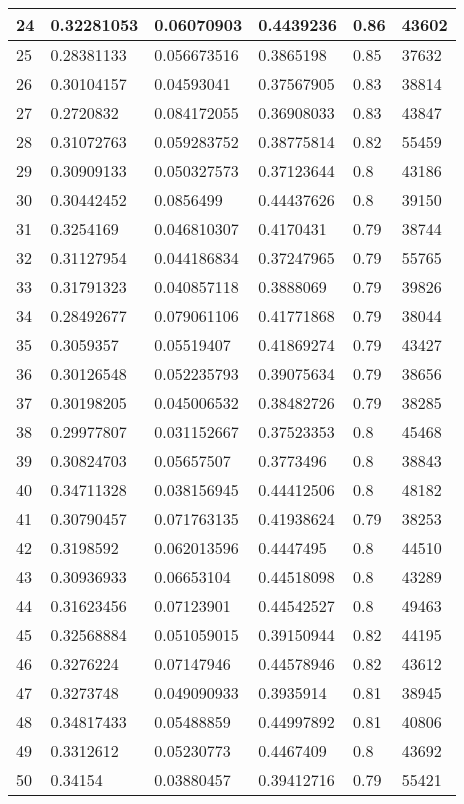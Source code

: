 \begin{longtable}{|l|l|l|l|l|l|}
24 & 0.32281053 & 0.06070903 & 0.4439236 & 0.86 & 43602 \\ \hline 
25 & 0.28381133 & 0.056673516 & 0.3865198 & 0.85 & 37632 \\ \hline 
26 & 0.30104157 & 0.04593041 & 0.37567905 & 0.83 & 38814 \\ \hline 
27 & 0.2720832 & 0.084172055 & 0.36908033 & 0.83 & 43847 \\ \hline 
28 & 0.31072763 & 0.059283752 & 0.38775814 & 0.82 & 55459 \\ \hline 
29 & 0.30909133 & 0.050327573 & 0.37123644 & 0.8 & 43186 \\ \hline 
30 & 0.30442452 & 0.0856499 & 0.44437626 & 0.8 & 39150 \\ \hline 
31 & 0.3254169 & 0.046810307 & 0.4170431 & 0.79 & 38744 \\ \hline 
32 & 0.31127954 & 0.044186834 & 0.37247965 & 0.79 & 55765 \\ \hline 
33 & 0.31791323 & 0.040857118 & 0.3888069 & 0.79 & 39826 \\ \hline 
34 & 0.28492677 & 0.079061106 & 0.41771868 & 0.79 & 38044 \\ \hline 
35 & 0.3059357 & 0.05519407 & 0.41869274 & 0.79 & 43427 \\ \hline 
36 & 0.30126548 & 0.052235793 & 0.39075634 & 0.79 & 38656 \\ \hline 
37 & 0.30198205 & 0.045006532 & 0.38482726 & 0.79 & 38285 \\ \hline 
38 & 0.29977807 & 0.031152667 & 0.37523353 & 0.8 & 45468 \\ \hline 
39 & 0.30824703 & 0.05657507 & 0.3773496 & 0.8 & 38843 \\ \hline 
40 & 0.34711328 & 0.038156945 & 0.44412506 & 0.8 & 48182 \\ \hline 
41 & 0.30790457 & 0.071763135 & 0.41938624 & 0.79 & 38253 \\ \hline 
42 & 0.3198592 & 0.062013596 & 0.4447495 & 0.8 & 44510 \\ \hline 
43 & 0.30936933 & 0.06653104 & 0.44518098 & 0.8 & 43289 \\ \hline 
44 & 0.31623456 & 0.07123901 & 0.44542527 & 0.8 & 49463 \\ \hline 
45 & 0.32568884 & 0.051059015 & 0.39150944 & 0.82 & 44195 \\ \hline 
46 & 0.3276224 & 0.07147946 & 0.44578946 & 0.82 & 43612 \\ \hline 
47 & 0.3273748 & 0.049090933 & 0.3935914 & 0.81 & 38945 \\ \hline 
48 & 0.34817433 & 0.05488859 & 0.44997892 & 0.81 & 40806 \\ \hline 
49 & 0.3312612 & 0.05230773 & 0.4467409 & 0.8 & 43692 \\ \hline 
50 & 0.34154 & 0.03880457 & 0.39412716 & 0.79 & 55421 \\ \hline 
\end{longtable}